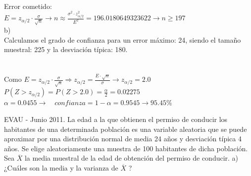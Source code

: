 \documentclass[spanish, 11pt]{exam}
\begin{document}
\begin{questions}
\begin{solution}
 \\
    Error cometido: \\ $E=z_{\alpha/2}\cdot \frac{\sigma}{\sqrt{n}} \to n \approx \frac{\sigma^2 \cdot z_{\alpha / 2}^2}{E^2}=196.0180649323622 \to n \geq197$ \\ b) \\ Calculamos el grado de confianza para un error máximo: 24, siendo el tamaño muestral: 225 y la desviación típica: 180. \\ \\  \\ Como $E=z_{\alpha / 2}\cdot \frac{\sigma}{\sqrt{n}} \Rightarrow z_{\alpha / 2} =\frac{E \cdot \sqrt{n}}{\sigma}\to z_{\alpha / 2}=2.0$ \\ $P(Z>z_{\alpha / 2})=P(Z>2.0)=\frac{\alpha}{2}=0.02275$ \\ $\alpha=0.0455 \to \quad confianza=1 - \alpha=0.9545 \to 95.45 \%$    \end{solution}\question EVAU - Junio 2011. La edad a la que obtienen el permiso de conducir los habitantes de una determinada población
es una variable aleatoria que se puede aproximar por una distribución normal de media 24 años y
desviación típica 4 años. Se elige aleatoriamente una muestra de 100 habitantes de dicha población. Sea $\overline{X}$
la media muestral de la edad de obtención del permiso de conducir.
a) ¿Cuáles son la media y la varianza de $\overline{X}$ ?


\end{questions}
\end{document}
